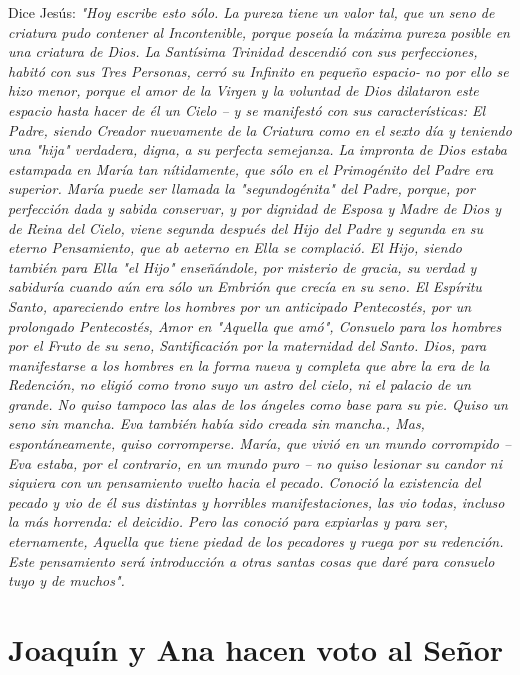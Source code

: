 \documentclass[12pt, twoside, openright]{book} %
\begin{document}
Dice Jesús: 
\emph{"Hoy escribe esto sólo. La pureza tiene un valor tal, que un seno de criatura pudo contener al Incontenible, porque poseía la máxima pureza posible en una criatura de Dios. La Santísima Trinidad descendió con sus perfecciones, habitó con sus Tres Personas, cerró su Infinito en pequeño espacio- no por ello se hizo menor, porque el amor de la Virgen y la voluntad de Dios dilataron este espacio hasta hacer de él un Cielo – y se manifestó con sus características: El Padre, siendo Creador nuevamente de la Criatura como en el sexto día y teniendo una "hija" verdadera, digna, a su perfecta semejanza. La impronta de Dios estaba estampada en María tan nítidamente, que sólo en el Primogénito del Padre era superior. María puede ser llamada la "segundogénita" del Padre, porque, por perfección dada y sabida conservar, y por dignidad de Esposa y Madre de Dios y de Reina del Cielo, viene segunda después del Hijo del Padre y segunda en su eterno Pensamiento, que ab aeterno en Ella se complació. El Hijo, siendo también para Ella "el Hijo" enseñándole, por misterio de gracia, su verdad y sabiduría cuando aún era sólo un Embrión que crecía en su seno. El Espíritu Santo, apareciendo entre los hombres por un anticipado Pentecostés, por un prolongado Pentecostés, Amor en "Aquella que amó", Consuelo para los hombres por el Fruto de su seno, Santificación por la maternidad del Santo. Dios, para manifestarse a los hombres en la forma nueva y completa que abre la era de la Redención, no eligió como trono suyo un astro del cielo, ni el palacio de un grande. No quiso tampoco las alas de los ángeles como base para su pie. Quiso un seno sin mancha. Eva también había sido creada sin mancha., Mas, espontáneamente, quiso corromperse. María, que vivió en un mundo corrompido – Eva estaba, por el contrario, en un mundo puro – no quiso lesionar su candor ni siquiera con un pensamiento vuelto hacia el pecado. Conoció la existencia del pecado y vio de él sus distintas y horribles manifestaciones, las vio todas, incluso la más horrenda: el deicidio. Pero las conoció para expiarlas y para ser, eternamente, Aquella que tiene piedad de los pecadores y ruega por su redención. Este pensamiento será introducción a otras santas cosas que daré para consuelo tuyo y de muchos".}
 
\chapter*{Joaquín y Ana hacen voto al Señor}
\end{document}
